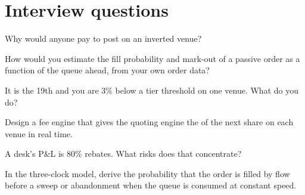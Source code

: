 \section{Interview questions}

\begin{interviewq}\label{iq:hf:rebates-inverted-venues-and-tiers:1}
Why would anyone pay to post on an inverted venue?
\end{interviewq}

\begin{interviewq}\label{iq:hf:rebates-inverted-venues-and-tiers:2}
How would you estimate the fill probability and mark-out of a passive order as a function of the queue ahead, from your own order data?
\end{interviewq}

\begin{interviewq}\label{iq:hf:rebates-inverted-venues-and-tiers:3}
It is the 19th and you are 3\% below a tier threshold on one venue. What do you do?
\end{interviewq}

\begin{interviewq}\label{iq:hf:rebates-inverted-venues-and-tiers:4}
Design a fee engine that gives the quoting engine the  of the next share on each venue in real time.
\end{interviewq}

\begin{interviewq}\label{iq:hf:rebates-inverted-venues-and-tiers:5}
A desk's P\&L is 80\% rebates. What risks does that concentrate?
\end{interviewq}

\begin{interviewq}\label{iq:hf:rebates-inverted-venues-and-tiers:6}
In the three-clock model, derive the probability that the order is filled by flow before a sweep or abandonment when the queue is consumed at
constant speed.
\end{interviewq}
